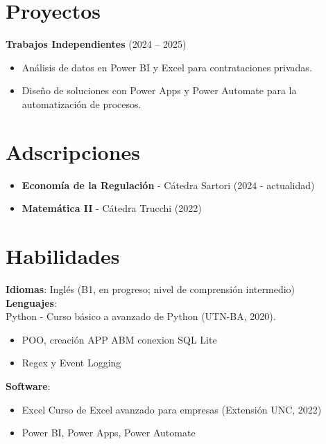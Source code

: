 \documentclass[a4paper,10pt]{article}
\begin{document}
\section*{Proyectos}
\textbf{Trabajos Independientes} (2024 – 2025) 
\begin{itemize} 
\item An\'alisis de datos en Power BI y Excel para contrataciones privadas.
    \item Dise\~no de soluciones con Power Apps y Power Automate para la automatizaci\'on de procesos.
\end{itemize}

\section*{Adscripciones}
\begin{itemize}
    \item \textbf{Econom\'ia de la Regulaci\'on} - Cátedra Sartori (2024 - actualidad)
    \item \textbf{Matemática II} - Cátedra Trucchi (2022)
\end{itemize}

\section*{Habilidades}
\textbf{Idiomas}: Ingl\'es (B1, en progreso; nivel de comprensi\'on intermedio) \\
\textbf{Lenguajes}: \\Python - Curso b\'asico a avanzado de Python (UTN-BA, 2020).
\begin{itemize}
    \item POO, creación APP ABM conexion SQL Lite
    \item Regex y Event Logging
\end{itemize}
\textbf{Software}:
\begin{itemize}
    \item Excel Curso de Excel avanzado para empresas (Extensi\'on UNC, 2022) 
    \item Power BI, Power Apps, Power Automate 
\end{itemize}
\end{document}
